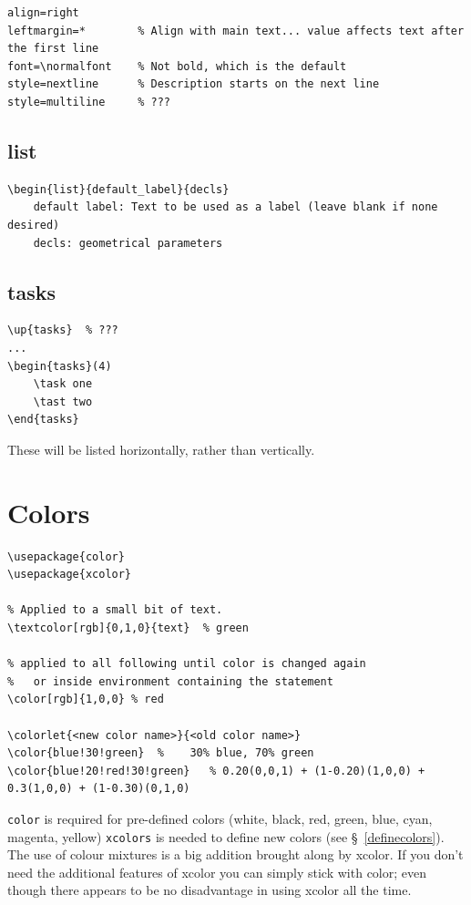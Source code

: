 \documentclass{article}
\begin{document}
\begin{lstlisting}
align=right
leftmargin=*        % Align with main text... value affects text after the first line
font=\normalfont    % Not bold, which is the default
style=nextline      % Description starts on the next line
style=multiline     % ???
\end{lstlisting}

\subsection{list}
\begin{lstlisting}
\begin{list}{default_label}{decls}
    default label: Text to be used as a label (leave blank if none desired)
    decls: geometrical parameters
\end{lstlisting}

\subsection{tasks}
\begin{lstlisting}
\up{tasks}  % ???
...
\begin{tasks}(4)
    \task one
    \tast two
\end{tasks}
\end{lstlisting}
These will be listed horizontally, rather than vertically.


\section{Colors}\label{color}
\begin{minipage}{0.5\textwidth}
\begin{lstlisting}
\usepackage{color}
\usepackage{xcolor}

% Applied to a small bit of text.
\textcolor[rgb]{0,1,0}{text}  % green

% applied to all following until color is changed again
%   or inside environment containing the statement
\color[rgb]{1,0,0} % red

\colorlet{<new color name>}{<old color name>}
\color{blue!30!green}  %    30% blue, 70% green
\color{blue!20!red!30!green}   % 0.20(0,0,1) + (1-0.20)(1,0,0) + 0.3(1,0,0) + (1-0.30)(0,1,0)

\end{lstlisting}
\end{minipage}
\begin{minipage}{0.5\textwidth}
\texttt{color} is required for pre-defined colors (white, black, red, green,
blue, cyan, magenta, yellow) \texttt{xcolors} is needed to define new
colors (see \S{}~\ref{definecolors}).  The use of colour mixtures is a big
addition brought along by xcolor. If
you don't need the additional features of xcolor you can simply stick with
color; even though there appears to be no disadvantage in using xcolor all
the time.
\end{minipage}
\end{document}
